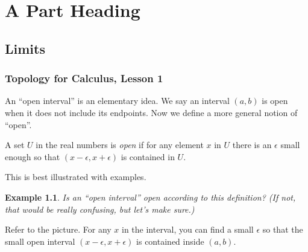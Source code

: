 \documentclass[11pt]{book}
\newenvironment{definition}[1][Definition]{\begin{trivlist}
\item[\hskip \labelsep {\bfseries #1}]}{\end{trivlist}}
\newtheorem{example}{Example}
\numberwithin{example}{chapter}
\begin{document}
\clearpage






\tableofcontents                        %








\mainmatter                             %

\part{A Part Heading}                   %



\chapter{Limits}     


\section{Topology for Calculus, Lesson 1}



An ``open interval'' is an elementary idea.  We say an interval $(a,b)$ is open when it does not include its endpoints.  Now we define a more general notion of ``open''.  




\begin{definition}
A set $U$ in the real numbers is \emph{open} if for any element $x$ in $U$ there is an $\epsilon$ small enough so that $(x-\epsilon , x+\epsilon)$ is contained in $U$.  


\end{definition}



This is best illustrated with examples.  

\begin{example}
Is an ``open interval'' \emph{ open} according to this definition?  (If not, that would be really confusing, but let's make sure.)
\end{example}

Refer to the picture.  For any $x$ in the interval, you can find a small $\epsilon$ so that the small open interval $(x-\epsilon , x+\epsilon)$ is contained inside $(a,b)$. 
\end{document}
